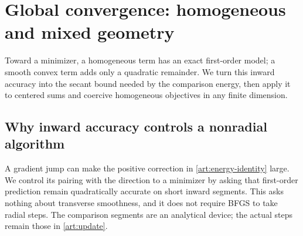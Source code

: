 \section{Global convergence: homogeneous and mixed geometry}\label{art:global}

Toward a minimizer, a homogeneous term has an exact first-order model;
a smooth convex term adds only a quadratic remainder. We turn this inward
accuracy into the secant bound needed by the comparison energy, then apply
it to centered sums and coercive homogeneous objectives in any finite
dimension.

\subsection{Why inward accuracy controls a nonradial algorithm}

A gradient jump can make the positive correction in
\eqref{art:energy-identity} large. We control its pairing with the direction
to a minimizer by asking that first-order prediction remain quadratically
accurate on short inward segments. This asks nothing about transverse
smoothness, and it does not require BFGS to take radial steps. The comparison
segments are an analytical device; the actual steps remain those in
\eqref{art:update}.

